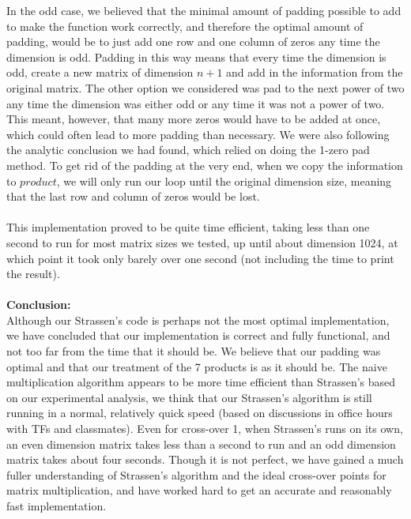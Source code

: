 \documentclass[11pt]{article}
\begin{document}
In the odd case, we believed that the minimal amount of padding possible to add to make the function work correctly, and therefore the optimal amount of padding, would be to just add one row and one column of zeros any time the dimension is odd. Padding in this way means that every time the dimension is odd, create a new matrix of dimension $n + 1$ and add in the information from the original matrix. The other option we considered was pad to the next power of two any time the dimension was either odd or any time it was not a power of two. This meant, however, that many more zeros would have to be added at once, which could often lead to more padding than necessary. We were also following the analytic conclusion we had found, which relied on doing the 1-zero pad method. To get rid of the padding at the very end, when we copy the information to $product$, we will only run our loop until the original dimension size, meaning that the last row and column of zeros would be lost. \\\\
This implementation proved to be quite time efficient, taking less than one second to run for most matrix sizes we tested, up until about dimension 1024, at which point it took only barely over one second (not including the time to print the result). \\\\ 

\textbf{Conclusion:} \\
Although our Strassen's code is perhaps not the most optimal implementation, we have concluded that our implementation is correct and fully functional, and not too far from the time that it should be. We believe that our padding was optimal and that our treatment of the 7 products is as it should be. The naive multiplication algorithm appears to be more time efficient than Strassen's based on our experimental analysis, we think that our Strassen's algorithm is still running in a normal, relatively quick speed (based on discussions in office hours with TFs and classmates). Even for cross-over 1, when Strassen's runs on its own, an even dimension matrix takes less than a second to run and an odd dimension matrix takes about four seconds. Though it is not perfect, we have gained a much fuller understanding of Strassen's algorithm and the ideal cross-over points for matrix multiplication, and have worked hard to get an accurate and reasonably fast implementation. 
\end{document}
